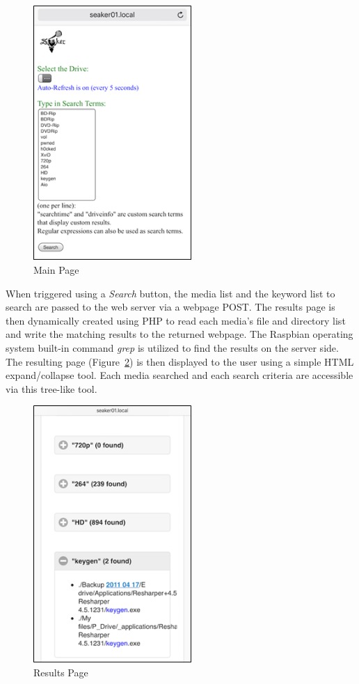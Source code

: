 \documentclass[12pt]{article}
\begin{document}
\begin{figure}[H]
  \begin{center}
  \includegraphics[width=6cm]{images/seaker-hh-screen-2.png}
  \caption{Main Page}
  \label{fig:MainPage}
  \end{center}
\end{figure}

When triggered using a {\em Search} button, the media list and the
keyword list to search are passed to the web server via a webpage POST.  The
results page is then dynamically created using PHP to read each media's file
and directory list and write the matching results to the returned webpage.
The Raspbian operating system built-in command {\em grep} is utilized to
find the results on the server side.\\

The resulting page (Figure~\ref{fig:ResultsPage}) is then displayed to the user 
using a simple HTML expand/collapse tool.  Each media searched and each search
criteria are accessible via this tree-like tool.\\

\begin{figure}[H]
  \begin{center}
  \includegraphics[width=6cm]{images/seaker-hh-screen-3.png}
  \caption{Results Page}
  \label{fig:ResultsPage}
  \end{center}
\end{figure}
\end{document}
